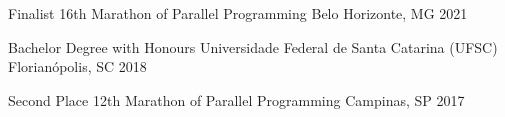 


\begin{cvhonors}

  \cvhonor
    {Finalist} %
    {16th Marathon of Parallel Programming} %
    {Belo Horizonte, MG} %
    {2021} %

  \cvhonor
    {Bachelor Degree with Honours} %
    {Universidade Federal de Santa Catarina (UFSC)} %
    {Florianópolis, SC} %
    {2018} %

  \cvhonor
    {Second Place} %
    {12th Marathon of Parallel Programming} %
    {Campinas, SP} %
    {2017} %


\end{cvhonors}
